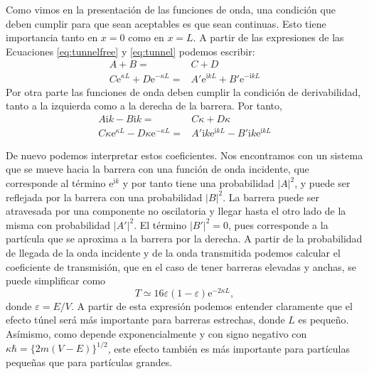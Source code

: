 Como vimos en la presentación de las funciones de onda, 
una condición que deben cumplir para que sean aceptables 
es que sean continuas. Esto tiene importancia tanto en $x=0$
como en $x=L$. A partir de las expresiones de las Ecuaciones
\ref{eq:tunnelfree} y \ref{eq:tunnel} podemos escribir:
\begin{subequations}
    \begin{align}
         A + B =&C + D \\
         C\mathrm{e}^{\kappa L} + D\mathrm{e}^{-\kappa L}=&
         A'\mathrm{e}^{\mathrm{i}kL} + B'\mathrm{e}^{-\mathrm{i}kL}
    \end{align}
\end{subequations}
Por otra parte las funciones de onda deben cumplir la
condición de derivabilidad, tanto a la izquierda como a
la derecha de la barrera. Por tanto,
\begin{subequations}
    \begin{align}
        A\mathrm{i}k-B\mathrm{i}k =& C\kappa + D\kappa \\
        C\kappa\mathrm{e}^{\kappa L} - D\kappa\mathrm{e}^{-\kappa L} =& A'\mathrm{i}k\mathrm{e}^{\mathrm{i}kL}-B'\mathrm{i}k\mathrm{e}^{\mathrm{i}kL}
    \end{align}
\end{subequations}

De nuevo podemos interpretar estos coeficientes. Nos 
encontramos con un sistema que se mueve hacia la barrera
con una función de onda incidente, que corresponde al 
término $\mathrm{e}^{\mathrm{i}k}$ y por tanto tiene una
probabilidad $|A|^2$, y puede ser reflejada por la barrera 
con una probabilidad $|B|^2$. La barrera puede ser atravesada
por una componente no oscilatoria y llegar hasta el otro lado
de la misma con probabilidad $|A'|^2$. El término $|B'|^2=0$,
pues corresponde a la partícula que se aproxima a la barrera
por la derecha. A partir de la probabilidad de llegada de la
onda incidente y de la onda transmitida podemos calcular
el coeficiente de transmisión, que en el caso de tener barreras
elevadas y anchas, se puede simplificar como
\begin{equation}
    T\simeq 16\varepsilon(1-\varepsilon)\mathrm{e}^{-2\kappa L},
\end{equation}
donde $\varepsilon=E/V$. A partir de esta expresión podemos
entender claramente que el efecto túnel será más importante 
para barreras estrechas, donde $L$ es pequeño. Asímismo,
como depende exponencialmente y con signo negativo con 
$\kappa\hbar=\{2m(V-E)\}^{1/2}$, este efecto también es
más importante para partículas pequeñas que para partículas
grandes.

